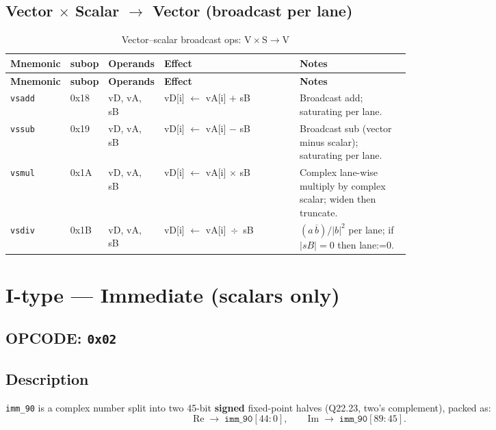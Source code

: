 \documentclass[10pt]{article}
\begin{document}
\subsection*{Vector $\times$ Scalar $\to$ Vector (broadcast per lane)}
\begin{longtable}{@{}l l l L{0.38\linewidth} L{0.30\linewidth}@{}}
\caption{Vector–scalar broadcast ops: $\mathrm{V}\times\mathrm{S} \to \mathrm{V}$}\label{tab:vs_to_v}\\
\toprule
\textbf{Mnemonic} & \textbf{subop} & \textbf{Operands} & \textbf{Effect} & \textbf{Notes} \\
\midrule
\endfirsthead
\toprule
\textbf{Mnemonic} & \textbf{subop} & \textbf{Operands} & \textbf{Effect} & \textbf{Notes} \\
\midrule
\endhead
\texttt{vsadd} & 0x18 & vD, vA, sB & vD[i] $\leftarrow$ vA[i] $+$ sB
  & Broadcast add; saturating per lane. \\
\texttt{vssub} & 0x19 & vD, vA, sB & vD[i] $\leftarrow$ vA[i] $-$ sB
  & Broadcast sub (vector minus scalar); saturating per lane. \\
\texttt{vsmul} & 0x1A & vD, vA, sB & vD[i] $\leftarrow$ vA[i] $\times$ sB
  & Complex lane-wise multiply by complex scalar; widen then truncate. \\
\texttt{vsdiv} & 0x1B & vD, vA, sB & vD[i] $\leftarrow$ vA[i] \,$\div$\, sB
  & $(a\,\overline{b})/|b|^2$ per lane; if $|sB|{=}0$ then lane:=0. \\
\bottomrule
\end{longtable}

\section*{I-type — Immediate (scalars only)}
\subsection*{OPCODE: \texttt{0x02}}
\subsection*{Description}
\noindent \texttt{imm\_90} is a complex number split into two 45-bit \textbf{signed} fixed-point halves (Q22.23, two’s complement), packed as:
\[
\text{Re} \;\to\; \texttt{imm\_90}[44{:}0], \qquad
\text{Im} \;\to\; \texttt{imm\_90}[89{:}45].
\]
\end{document}
